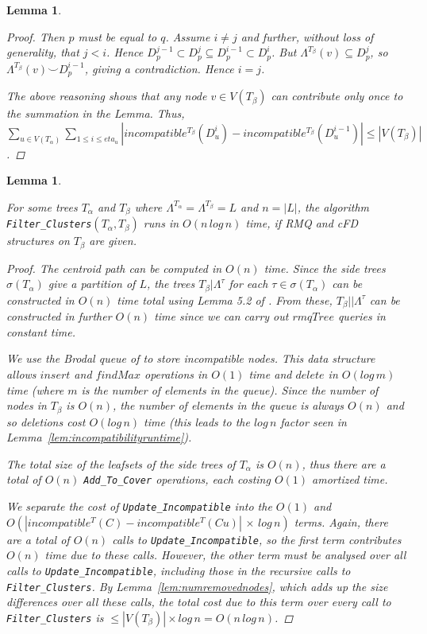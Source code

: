 \documentclass{article}
\newcommand{\compatible}{\smile}
\newcommand{\leafset}{\Lambda}
\newcommand{\TA}{T_\alpha}
\newcommand{\TB}{T_\beta}
\newtheorem{numremovednodes}[incompatibility]{Lemma}
\newtheorem{filterclustersruntime}[incompatibility]{Lemma}
\begin{document}
\begin{numremovednodes}
\begin{proof}
            Then $p$ must be equal to $q$. Assume $i \neq j$ and further, without loss of generality, that $j < i$. Hence $D_p^{j-1} \subset D_p^{j} \subseteq D_p^{i-1} \subset D_p^{i}$. But $\leafset^{\TB}(v) \subseteq D_p^j$, so $\leafset^{\TB}(v) \compatible D_p^{i-1}$, giving a contradiction. Hence $i = j$.

            The above reasoning shows that any node $v \in V(\TB)$ can contribute only once to the summation in the Lemma. Thus, $\sum_{u \in V(\TA)} \sum_{1 \leq i \leq eta_u} |incompatible^{\TB}(D_u^i) - incompatible^{\TB}(D_u^{i-1})| \leq |V(\TB)|$.
        \end{proof}
    \end{numremovednodes}

    \medskip
    \begin{filterclustersruntime}
        \label{lem:filterclustersruntime}

        For some trees $\TA$ and $\TB$ where $\leafset^{\TA} = \leafset^{\TB} = L$ and $n = |L|$, the algorithm \texttt{Filter\_Clusters}$(\TA, \TB)$ runs in $O(n\,log\,n)$ time, if RMQ and cFD structures on $\TB$ are given.

        \begin{proof}
            The centroid path can be computed in $O(n)$ time. Since the side trees $\sigma(\TA)$ give a partition of $L$, the trees $\TB|\leafset^{\tau}$ for each $\tau \in \sigma(\TA)$ can be constructed in $O(n)$ time total using Lemma 5.2 of \cite{farach1995fast}. From these, $\TB||\leafset^{\tau}$ can be constructed in further $O(n)$ time since we can carry out $rmqTree$ queries in constant time.

            We use the Brodal queue of \cite{brodal1995fast} to store incompatible nodes. This data structure allows $insert$ and $findMax$ operations in $O(1)$ time and $delete$ in $O(log\,m)$ time (where $m$ is the number of elements in the queue). Since the number of nodes in $\TB$ is $O(n)$, the number of elements in the queue is always $O(n)$ and so deletions cost $O(log\,n)$ time (this leads to the $log\,n$ factor seen in Lemma~\ref{lem:incompatibilityruntime}).

            The total size of the leafsets of the side trees of $\TA$ is $O(n)$, thus there are a total of $O(n)$ \texttt{Add\_To\_Cover} operations, each costing $O(1)$ amortized time.

            We separate the cost of \texttt{Update\_Incompatible} into the $O(1)$ and $O(|incompatible^{T}(C) - incompatible^{T}(Cu)|\,\times\,log\,n)$ terms. Again, there are a total of $O(n)$ calls to \texttt{Update\_Incompatible}, so the first term contributes $O(n)$ time due to these calls. However, the other term must be analysed over all calls to \texttt{Update\_Incompatible}, including those in the recursive calls to \texttt{Filter\_Clusters}. By Lemma~\ref{lem:numremovednodes}, which adds up the size differences over all these calls, the total cost due to this term over every call to \texttt{Filter\_Clusters} is $\leq |V(\TB)| \times log\,n = O(n\,log\,n)$.


\end{proof}
\end{filterclustersruntime}
\end{document}
